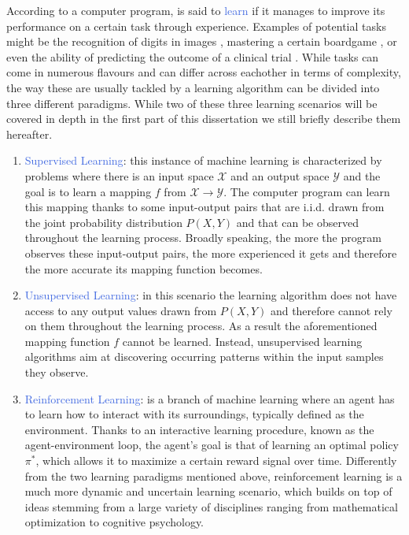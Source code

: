 According to \citet{mitchell1997machine} a computer program, is said to \textcolor{RoyalBlue}{learn} if it manages to improve its performance on a certain task through experience.
Examples of potential tasks might be the recognition of digits in images \cite{lecun1994mnist}, mastering a certain boardgame \cite{silver2017mastering}, or even the ability of predicting the outcome of a clinical trial \cite{zhao2011reinforcement}. While tasks can come in numerous flavours and can differ across eachother in terms of complexity, the way these are usually tackled by a learning algorithm can be divided into three different paradigms. While two of these three learning scenarios will be covered in depth in the first part of this dissertation we still briefly describe them hereafter.

\begin{enumerate}
	\item \textcolor{RoyalBlue}{Supervised Learning}: this instance of machine learning is characterized by problems where there is an input space $\mathcal{X}$ and an output space $\mathcal{Y}$ and the goal is to learn a mapping $f$ from $\mathcal{X}\rightarrow\mathcal{Y}$. The computer program can learn this mapping thanks to some input-output pairs that are i.i.d. drawn from the joint probability distribution $P(X,Y)$ and that can be observed throughout the learning process. Broadly speaking, the more the program observes these input-output pairs, the more experienced it gets and therefore the more accurate its mapping function becomes.  
	\item \textcolor{RoyalBlue}{Unsupervised Learning}: in this scenario the learning algorithm does not have access to any output values drawn from $P(X,Y)$ and therefore cannot rely on them throughout the learning process. As a result the aforementioned mapping function $f$ cannot be learned. Instead, unsupervised learning algorithms aim at discovering occurring patterns within the input samples they observe.  
	\item \textcolor{RoyalBlue}{Reinforcement Learning}: is a branch of machine learning where an agent has to learn how to interact with its surroundings, typically defined as the environment. Thanks to an interactive learning procedure, known as the agent-environment loop, the agent's goal is that of learning an optimal policy $\pi^{*}$, which allows it to maximize a certain reward signal over time. Differently from the two learning paradigms mentioned above, reinforcement learning is a much more dynamic and uncertain learning scenario, which builds on top of ideas stemming from a large variety of disciplines ranging from mathematical optimization to cognitive psychology.   
\end{enumerate}


